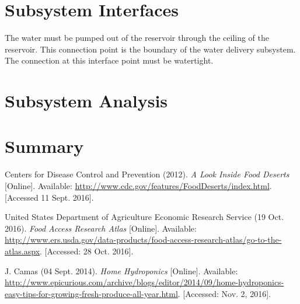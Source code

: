 \documentclass[12pt]{article}
\begin{document}
\section{Subsystem Interfaces}


The water must be pumped out of the reservoir through the ceiling of the reservoir. This connection
point is the boundary of the water delivery subsystem. The connection at this interface point must
be watertight.



\section{Subsystem Analysis}


\section{Summary}


\pagebreak

\pagebreak

\begin{thebibliography}{9}
    Centers for Disease Control and Prevention (2012).
    \textit{A Look Inside Food Deserts} [Online].
    Available: \url{http://www.cdc.gov/features/FoodDeserts/index.html}.
    [Accessed 11 Sept. 2016].

    United States Department of Agriculture Economic Research Service (19 Oct. 2016).
    \textit{Food Access Research Atlas} [Online].
    Available:
    \url{http://www.ers.usda.gov/data-products/food-access-research-atlas/go-to-the-atlas.aspx}.
    [Accessed: 28 Oct. 2016].

    J. Camas (04 Sept. 2014).
    \textit{Home Hydroponics} [Online].
    Available:
    \url{http://www.epicurious.com/archive/blogs/editor/2014/09/home-hydroponics-easy-tips-for-growing-fresh-produce-all-year.html}.
    [Accessed: Nov. 2, 2016].

\end{thebibliography}
\end{document}
